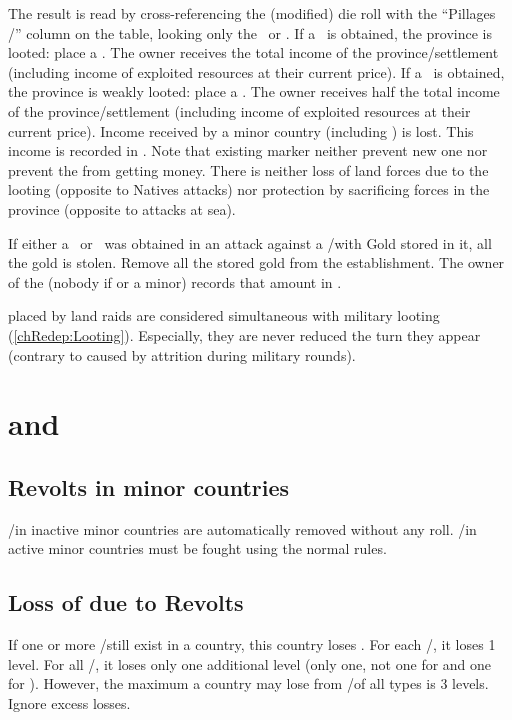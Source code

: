 \bparag The result is read by cross-referencing the (modified) die roll with
the ``Pillages \TP/\COL'' column on the table, looking only the \textdag\ or
\textddag.
\bparag If a \textddag\ is obtained, the province is looted: place a
\PILLAGE\faceplus. The \corsaire owner receives the total income of the
province/settlement (including income of exploited resources at their current
price).
\bparag If a \textdag\ is obtained, the province is weakly looted: place a
\PILLAGE\facemoins. The \corsaire owner receives half the total income of
the province/settlement (including income of exploited resources at their
current price).
\bparag Income received by a minor country (including ) is
lost.
\bparag This income is recorded in .
\bparag Note that existing \PILLAGE marker neither prevent new one nor prevent
the \corsaire from getting money.
\bparag There is neither loss of land forces due to the looting (opposite to
Natives attacks) nor protection by sacrificing forces in the province
(opposite to attacks at sea).

\bparag If either a \textdag\ or \textddag\ was obtained in an attack against
a \COL/\TP with Gold stored in it, all the gold is stolen.
\bparag Remove all the stored gold from the establishment.
\bparag The owner of the \corsaire (nobody if  or a minor)
records that amount in .

\bparag \PILLAGE placed by land raids are considered simultaneous with
military looting (\ref{chRedep:Looting}).
\bparag Especially, they are never reduced the turn they appear (contrary to
\PILLAGE caused by attrition during military rounds).

\section{\REVOLT and \REBELLION}\label{chRedep:Revolts}
\subsection{Revolts in minor countries}
\label{chRedep:Revolts:Minors}
\aparag \REVOLT/\REBELLION in inactive minor countries are automatically
removed without any roll.
\bparag \REVOLT/\REBELLION in active minor countries must be fought using the
normal rules.

\subsection{Loss of \STAB due to Revolts}
\label{chRedep:Revolts Stability}
\aparag If one or more \REVOLT/\REBELLION still exist in a country, this
country loses \STAB.
\bparag For each \REVOLT/\REBELLION\faceplus, it loses 1 \STAB level.
\bparag For all \REVOLT/\REBELLION\facemoins, it loses only one additional
\STAB level (only one, not one for \REVOLT and one for \REBELLION).
\aparag However, the maximum a country may lose from \REVOLT/\REBELLION of all
types is 3 \STAB levels. Ignore excess losses.

